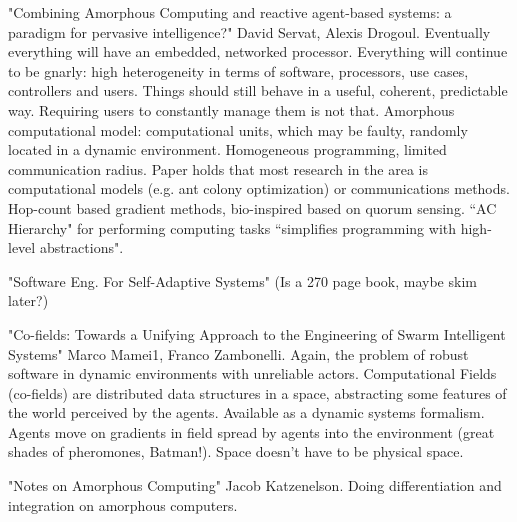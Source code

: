\documentclass[]{article}
\begin{document}

"Combining Amorphous Computing and reactive agent-based systems: a paradigm for pervasive intelligence?" David Servat, Alexis Drogoul. Eventually everything will have an embedded, networked processor. Everything will continue to be gnarly: high heterogeneity in terms of software, processors, use cases, controllers and users. Things should still behave in a useful, coherent, predictable way. Requiring users to constantly manage them is not that. Amorphous computational model: computational units, which may be faulty, randomly located in a dynamic environment. Homogeneous programming, limited communication radius. Paper holds that most research in the area is computational models (e.g. ant colony optimization) or communications methods. Hop-count based gradient methods, bio-inspired based on quorum sensing. ``AC Hierarchy" for performing computing tasks ``simplifies programming with high-level abstractions". 

"Software Eng. For Self-Adaptive Systems" (Is a 270 page book, maybe skim later?)

"Co-fields: Towards a Unifying Approach to the Engineering of Swarm Intelligent Systems" \cite{mamei2003co} Marco Mamei1, Franco Zambonelli. Again, the problem of robust software in dynamic environments with unreliable actors. Computational Fields (co-fields) are distributed data structures in a space, abstracting some features of the world perceived by the agents. Available as a dynamic systems formalism. Agents move on gradients in field spread by agents into the environment (great shades of pheromones, Batman!). Space doesn't have to be physical space. 


"Notes on Amorphous Computing" Jacob Katzenelson. \cite{katzenelson2000notes} Doing differentiation and integration on amorphous computers. 
\end{document}
